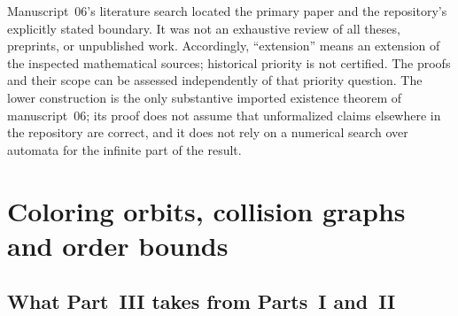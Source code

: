 \documentclass[11pt,a4paper]{article}
\numberwithin{equation}{section}
\theoremstyle{definition}
\theoremstyle{remark}
\begin{document}
Manuscript~06's literature search located the primary paper and the
repository's explicitly stated boundary. It was not an exhaustive review of
all theses, preprints, or unpublished work. Accordingly, ``extension'' means
an extension of the inspected mathematical sources; historical priority is not
certified. The proofs and their scope can be assessed independently of that
priority question. The lower construction is the only substantive imported
existence theorem of manuscript~06; its proof does not assume that
unformalized claims elsewhere in the repository are correct, and it does not
rely on a numerical search over automata for the infinite part of the result.

\section{Coloring orbits, collision graphs and order bounds}\label{evo:sec:graphs}

\subsection{What Part~III takes from Parts~I and~II}\label{evo:sec:imported}
\end{document}
